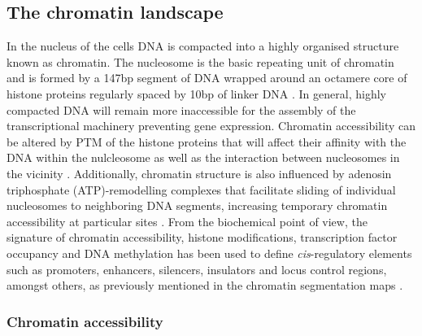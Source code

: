 \subsection{The chromatin landscape}
In the nucleus of the cells DNA is compacted into a highly organised structure known as chromatin. The nucleosome is the basic repeating unit of chromatin and is formed by a 147bp segment of DNA wrapped around an octamere core of histone proteins regularly spaced by 10bp of linker DNA \parencite{Luger1997}. In general, highly compacted DNA will remain more inaccessible for the assembly of the transcriptional machinery preventing gene expression. Chromatin accessibility can be altered by PTM of the histone proteins that will affect their affinity with the DNA within the nulcleosome as well as the interaction between nucleosomes in the vicinity \parencite{Polach2000,Pepenella2014}. Additionally, chromatin structure is also influenced by adenosin triphosphate (ATP)-remodelling complexes that facilitate sliding of individual nucleosomes to neighboring DNA segments, increasing temporary chromatin accessibility at particular sites \parencite{Cosma1999}. From the biochemical point of view, the signature of chromatin accessibility, histone modifications, transcription factor occupancy and DNA methylation has been used to define \textit{cis}-regulatory elements such as promoters, enhancers, silencers, insulators and locus control regions, amongst others, as previously mentioned in the chromatin segmentation maps \parencite{Boyle2012,Kundaje2015}.




\subsubsection{Chromatin accessibility}

